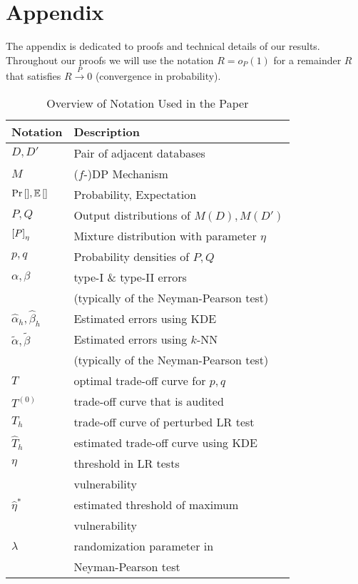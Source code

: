 $ $\newpage
\appendix

\section{Appendix}
The appendix is dedicated to proofs and technical details of our results. Throughout our proofs we will use the notation $R= o_P(1)$ for a remainder $R$ that satisfies $R \overset{P}{\to}0$ (convergence in probability).

\begin{table}[ht]
\centering
\caption{Overview of Notation Used in the Paper}
\label{tab:notation}
\begin{tabular}{ll}
\toprule
\textbf{Notation} & \textbf{Description} \\
\midrule
\( D,D'\) & Pair of adjacent databases \\
\( M \) & ($f$-)DP Mechanism \\
\( \Pr{}[ ], \mathbb{E} \left[   \right ] \) & Probability, Expectation\\
\( P,Q \) & Output distributions of $M(D), M(D')$ \\
\(\left[P\right]_{\eta}\) & Mixture distribution with parameter $\eta$\\
\( p,q\) & Probability densities of $P,Q$  \\
\( \alpha, \beta \) & type-I \& type-II errors \\
& (typically of the Neyman-Pearson test) \\
\(\hat \alpha_h, \hat \beta_h\) & Estimated errors using KDE \\
\(\tilde \alpha, \tilde \beta\) & Estimated errors using $k$-NN \\
& (typically of the Neyman-Pearson test) \\
\( T\) & optimal trade-off curve for $p,q$\\
\( T^{(0)}\) & trade-off curve that is audited\\
\( T_h\) & trade-off curve of perturbed LR test \\
\( \hat T_h\) & estimated trade-off curve using KDE \\
\(  \eta\) & threshold in LR tests \\
& vulnerability \\
\( \hat \eta^*\) & estimated threshold of maximum \\
& vulnerability \\
\(  \lambda\) & randomization parameter in \\
 & Neyman-Pearson test \\

\end{tabular}
\end{table}
